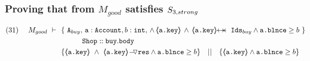 \subsubsection{Proving that  from $M_{good}$ satisfies $S_{3,strong}$}
\label{s:buy:sat:S3}

\begin{lemma}
\label{l:buy:sat:S3}
 
\begin{align*}
\text{(31)}  \ \ \ \ M_{good}\ \vdash  \  \ 
		&	\{  \ \Alocals, \, \prg{a}:\prg{Account}, b:\prg{int}, \, \wedge\, {\inside{\prg{a.key}}} \, \wedge \, \protectedFrom {\prg{a.key}} {\Ids} \wedge \prg{a.\balance}\geq b \  \} \\
		& \SPT \prg{Shop}::\prg{buy}.\prg{body}\ \\  
		& \{ {\inside{\prg{a.key}}}\ \wedge\ {\PushASLong {\prg{res}} {\inside{\prg{a.key}}}}  \wedge \prg{a.\balance}\geq b \} \ \ \  || \ \ \ 
		   \{ {\inside{\prg{a.key}}}  \wedge \prg{a.\balance}\geq b \}
\end{align*}

\end{lemma}

